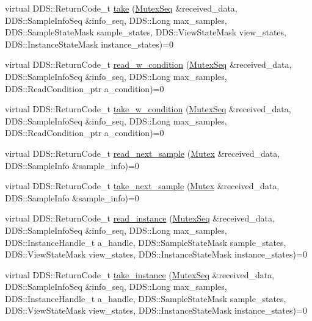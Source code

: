 \begin{DoxyCompactItemize}
\item 
virtual DDS::ReturnCode\_\-t \hyperlink{classKnowledge_1_1MutexDataReaderView_adf68b09d49094cf08f828a2d1d66c960}{take} (\hyperlink{namespaceKnowledge_a3165529aa87299c6a92754fbd7eeeff4}{MutexSeq} \&received\_\-data, DDS::SampleInfoSeq \&info\_\-seq, DDS::Long max\_\-samples, DDS::SampleStateMask sample\_\-states, DDS::ViewStateMask view\_\-states, DDS::InstanceStateMask instance\_\-states)=0
\item 
virtual DDS::ReturnCode\_\-t \hyperlink{classKnowledge_1_1MutexDataReaderView_aa4c7e4993accd8e7ce7bf97a4a5fc415}{read\_\-w\_\-condition} (\hyperlink{namespaceKnowledge_a3165529aa87299c6a92754fbd7eeeff4}{MutexSeq} \&received\_\-data, DDS::SampleInfoSeq \&info\_\-seq, DDS::Long max\_\-samples, DDS::ReadCondition\_\-ptr a\_\-condition)=0
\item 
virtual DDS::ReturnCode\_\-t \hyperlink{classKnowledge_1_1MutexDataReaderView_a48705feff73fc74c7c798735038e2aaa}{take\_\-w\_\-condition} (\hyperlink{namespaceKnowledge_a3165529aa87299c6a92754fbd7eeeff4}{MutexSeq} \&received\_\-data, DDS::SampleInfoSeq \&info\_\-seq, DDS::Long max\_\-samples, DDS::ReadCondition\_\-ptr a\_\-condition)=0
\item 
virtual DDS::ReturnCode\_\-t \hyperlink{classKnowledge_1_1MutexDataReaderView_a9676c07ee0f092da46f349944db3b9c6}{read\_\-next\_\-sample} (\hyperlink{structKnowledge_1_1Mutex}{Mutex} \&received\_\-data, DDS::SampleInfo \&sample\_\-info)=0
\item 
virtual DDS::ReturnCode\_\-t \hyperlink{classKnowledge_1_1MutexDataReaderView_abc859e968b2707fc78be5f0c530db511}{take\_\-next\_\-sample} (\hyperlink{structKnowledge_1_1Mutex}{Mutex} \&received\_\-data, DDS::SampleInfo \&sample\_\-info)=0
\item 
virtual DDS::ReturnCode\_\-t \hyperlink{classKnowledge_1_1MutexDataReaderView_ac5e9aaab2d50448a2ee5e5c2ef5e3188}{read\_\-instance} (\hyperlink{namespaceKnowledge_a3165529aa87299c6a92754fbd7eeeff4}{MutexSeq} \&received\_\-data, DDS::SampleInfoSeq \&info\_\-seq, DDS::Long max\_\-samples, DDS::InstanceHandle\_\-t a\_\-handle, DDS::SampleStateMask sample\_\-states, DDS::ViewStateMask view\_\-states, DDS::InstanceStateMask instance\_\-states)=0
\item 
virtual DDS::ReturnCode\_\-t \hyperlink{classKnowledge_1_1MutexDataReaderView_a83f4b137ae772474c1fa5146de9ad0c8}{take\_\-instance} (\hyperlink{namespaceKnowledge_a3165529aa87299c6a92754fbd7eeeff4}{MutexSeq} \&received\_\-data, DDS::SampleInfoSeq \&info\_\-seq, DDS::Long max\_\-samples, DDS::InstanceHandle\_\-t a\_\-handle, DDS::SampleStateMask sample\_\-states, DDS::ViewStateMask view\_\-states, DDS::InstanceStateMask instance\_\-states)=0

\end{DoxyCompactItemize}
